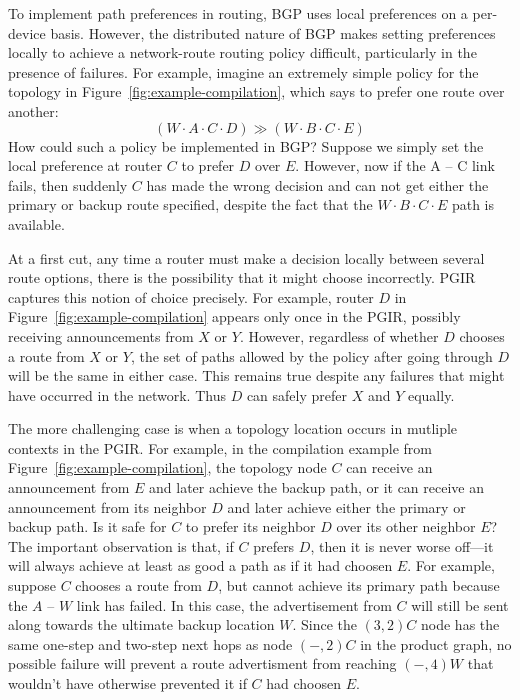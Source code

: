 
To implement path preferences in routing, BGP uses local preferences on a per-device basis. However, the distributed nature of BGP makes setting preferences locally to achieve a network-route routing policy difficult, particularly in the presence of failures. For example, imagine an extremely simple policy for the topology in Figure~\ref{fig:example-compilation}, which says to prefer one route over another:
%
$$(W \cdot A \cdot C \cdot D) \gg (W \cdot B \cdot C \cdot E)$$
%
How could such a policy be implemented in BGP? Suppose we simply set the local preference at router $C$ to prefer $D$ over $E$. However, now if the A -- C link fails, then suddenly $C$ has made the wrong decision and can not get either the primary or backup route specified, despite the fact that the $W \cdot B \cdot C \cdot E$ path is available.

At a first cut, any time a router must make a decision locally between several route options, there is the possibility that it might choose incorrectly. PGIR captures this notion of choice precisely. For example, router $D$ in Figure~\ref{fig:example-compilation} appears only once in the PGIR, possibly receiving announcements from $X$ or $Y$. However, regardless of whether $D$ chooses a route from $X$ or $Y$, the set of paths allowed by the policy after going through $D$ will be the same in either case. This remains true despite any failures that might have occurred in the network. Thus $D$ can safely prefer $X$ and $Y$ equally.

The more challenging case is when a topology location occurs in mutliple contexts in the PGIR. For example, in the compilation example from Figure~\ref{fig:example-compilation}, the topology node $C$ can receive an announcement from $E$ and later achieve the backup path, or it can receive an announcement from its neighbor $D$ and later achieve either the primary or backup path. Is it safe for $C$ to prefer its neighbor $D$ over its other neighbor $E$? The important observation is that, if $C$ prefers $D$, then it is never worse off---it will always achieve at least as good a path as if it had choosen $E$.
For example, suppose $C$ chooses a route from $D$, but cannot achieve its primary path because the $A$ -- $W$ link has failed. In this case, the advertisement from $C$ will still be sent along towards the ultimate backup location $W$. Since the $(3,2) C$ node has the same one-step and two-step next hops as node $(-,2) C$ in the product graph, no possible failure will prevent a route advertisment from reaching $(-,4) W$ that wouldn't have otherwise prevented it if $C$ had choosen $E$.

